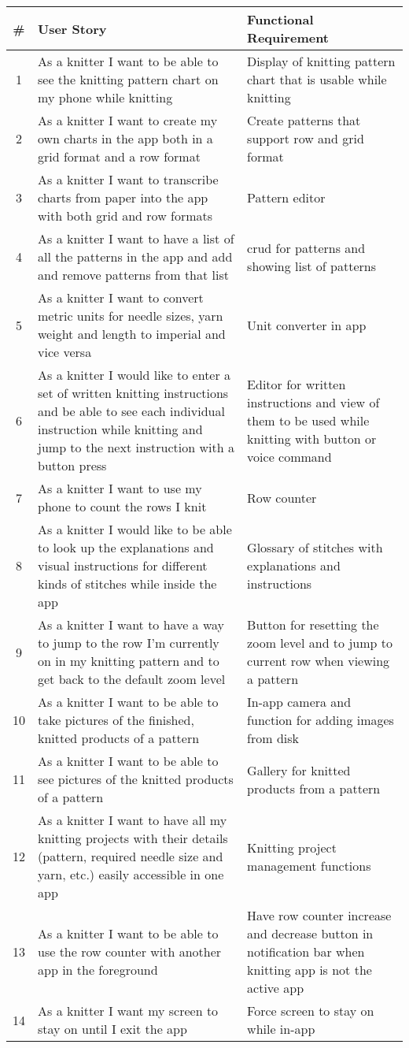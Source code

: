 \label{tabl:requirements}
\begin{longtable}{| c | p{6.5cm} | p{6.5cm} |}
    \hline
   	\# & User Story & Functional Requirement \\ \hline
   	\endhead
    1 &	As a knitter I want to be able to see the knitting pattern chart on my phone while knitting &
	 Display of knitting pattern chart that is usable while knitting \\ \hline
	2 & As a knitter I want to create my own charts in the app both in a grid format and a row format & Create patterns that support row and grid format \\ \hline
	3 & As a knitter I want to transcribe charts from paper into the app with both grid and row formats & Pattern editor \\ \hline
	4 & As a knitter I want to have a list of all the patterns in the app and add and remove patterns from that list & \gls{crud} for patterns and showing list of patterns \\ \hline
	5 & As a knitter I want to convert metric units for needle sizes, yarn weight and length to imperial and vice versa & Unit converter in app  \\ \hline
	6 & As a knitter I would like to enter a set of written knitting instructions and be able to see each individual instruction while knitting and jump to the next instruction with a button press & Editor for written instructions and view of them to be used while knitting with button or voice command \\ \hline
	7 & As a knitter I want to use my phone to count the rows I knit & Row counter \\ \hline
	8 & As a knitter I would like to be able to look up the explanations and visual instructions for different kinds of stitches while inside the app & Glossary of stitches with explanations and instructions \\ \hline
	9 & As a knitter I want to have a way to jump to the row I'm currently on in my knitting pattern and to get back to the default zoom level & Button for resetting the zoom level and to jump to current row when viewing a pattern \\ \hline
	10 & As a knitter I want to be able to take pictures of the finished, knitted products of a pattern & In-app camera and function for adding images from disk \\ \hline
	11 & As a knitter I want to be able to see pictures of the knitted products of a pattern & Gallery for knitted products from a pattern \\ \hline
	12 & As a knitter I want to have all my knitting projects with their details (pattern, required needle size and yarn, etc.) easily accessible in one app & Knitting project management functions  \\ \hline
	13 & As a knitter I want to be able to use the row counter with another app in the foreground &  Have row counter increase and decrease button in notification bar when knitting app is not the active app \\ \hline
	14 & As a knitter I want my screen to stay on until I exit the app & Force screen to stay on while in-app \\ \hline
\end{longtable}

